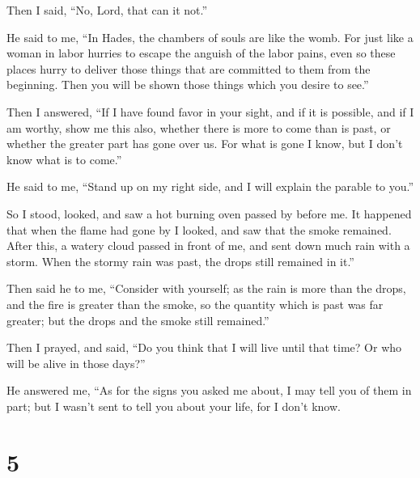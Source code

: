  Then I said, ``No, Lord, that can it not.''

He said to me, ``In Hades, the chambers of souls are like the womb.
 For just like a woman in labor hurries to escape the
anguish of the labor pains, even so these places hurry to deliver those
things that are committed to them from the beginning. 
Then you will be shown those things which you desire to see.''

 Then I answered, ``If I have found favor in your sight,
and if it is possible, and if I am worthy,  show me this
also, whether there is more to come than is past, or whether the greater
part has gone over us.  For what is gone I know, but I
don't know what is to come.''

 He said to me, ``Stand up on my right side, and I will
explain the parable to you.''

 So I stood, looked, and saw a hot burning oven passed by
before me. It happened that when the flame had gone by I looked, and saw
that the smoke remained.  After this, a watery cloud
passed in front of me, and sent down much rain with a storm. When the
stormy rain was past, the drops still remained in it.''

 Then said he to me, ``Consider with yourself; as the
rain is more than the drops, and the fire is greater than the smoke, so
the quantity which is past was far greater; but the drops and the smoke
still remained.''

 Then I prayed, and said, ``Do you think that I will live
until that time? Or who will be alive in those days?''

 He answered me, ``As for the signs you asked me about, I
may tell you of them in part; but I wasn't sent to tell you about your
life, for I don't know.

\hypertarget{section-4}{%
\section{5}\label{section-4}}

